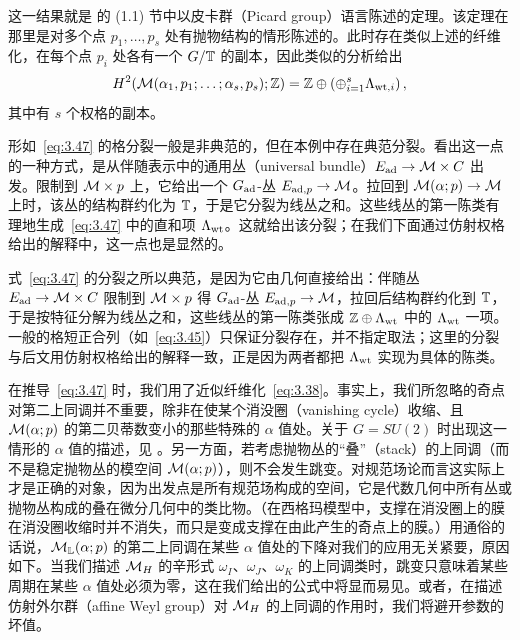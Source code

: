 这一结果就是 \cite{ref54} 的 (1.1) 节中以皮卡群（Picard group）语言陈述的定理。该定理在那里是对多个点 $p_1,\dots,p_s$ 处有抛物结构的情形陈述的。此时存在类似上述的纤维化，在每个点 $p_i$ 处各有一个 $G/{\mathbb{T}}$ 的副本，因此类似的分析给出
\setcounter{equation}{47}
\begin{equation}\label{eq:3.48}
  H^2({\mathcal{M}}(\alpha_1,p_1;\dots;\alpha_s,p_s);{\mathbb{Z}})={\mathbb{Z}}\oplus\left(\oplus_{i=1}^s
\Lambda_{{\rm wt},i}\right),
\end{equation}
其中有 $s$ 个权格的副本。

形如~\eqref{eq:3.47} 的格分裂一般是非典范的，但在本例中存在典范分裂。看出这一点的一种方式，是从伴随表示中的通用丛（universal bundle）$E_{\rm ad}\to {\mathcal{M}}\times C$ 出发。限制到 ${\mathcal{M}}\times p$ 上，它给出一个 $G_{\rm ad}$-丛 $E_{{\rm ad},p}\to {\mathcal{M}}$。拉回到 ${\mathcal{M}}(\alpha;p)\to {\mathcal{M}}$ 上时，该丛的结构群约化为 ${\mathbb{T}}$，于是它分裂为线丛之和。这些线丛的第一陈类有理地生成~\eqref{eq:3.47} 中的直和项 $\Lambda_{\rm wt}$。这就给出该分裂；在我们下面通过仿射权格给出的解释中，这一点也是显然的。

\begin{yizhu}[易错点]式~\eqref{eq:3.47} 的分裂之所以典范，是因为它由几何直接给出：伴随丛 $E_{\rm ad}\to {\mathcal{M}}\times C$ 限制到 ${\mathcal{M}}\times p$ 得 $G_{\rm ad}$-丛 $E_{{\rm ad},p}\to{\mathcal{M}}$，拉回后结构群约化到 ${\mathbb{T}}$，于是按特征分解为线丛之和，这些线丛的第一陈类张成 ${\mathbb{Z}}\oplus\Lambda_{\rm wt}$ 中的 $\Lambda_{\rm wt}$ 一项。一般的格短正合列（如~\eqref{eq:3.45}）只保证分裂存在，并不指定取法；这里的分裂与后文用仿射权格给出的解释一致，正是因为两者都把 $\Lambda_{\rm wt}$ 实现为具体的陈类。\end{yizhu}

在推导~\eqref{eq:3.47} 时，我们用了近似纤维化~\eqref{eq:3.38}。事实上，我们所忽略的奇点对第二上同调并不重要，除非在使某个消没圈（vanishing cycle）收缩、且 ${\mathcal{M}}(\alpha;p)$ 的第二贝蒂数变小的那些特殊的 $\alpha$ 值处。关于 $G=SU(2)$ 时出现这一情形的 $\alpha$ 值的描述，见 \cite{ref55}。另一方面，若考虑抛物丛的“叠”（stack）的上同调（而不是稳定抛物丛的模空间 ${\mathcal{M}}(\alpha;p)$），则不会发生跳变。对规范场论而言这实际上才是正确的对象，因为出发点是所有规范场构成的空间，它是代数几何中所有丛或抛物丛构成的叠在微分几何中的类比物。（在西格玛模型中，支撑在消没圈上的膜在消没圈收缩时并不消失，而只是变成支撑在由此产生的奇点上的膜。）用通俗的话说，${\mathcal{M}}_\mathbb{L}(\alpha;p)$ 的第二上同调在某些 $\alpha$ 值处的下降对我们的应用无关紧要，原因如下。当我们描述 ${{\mathcal{M}}_H}$ 的辛形式 $\omega_I$、$\omega_J$、$\omega_K$ 的上同调类时，跳变只意味着某些周期在某些 $\alpha$ 值处必须为零，这在我们给出的公式中将显而易见。或者，在描述仿射外尔群（affine Weyl group）对 ${{\mathcal{M}}_H}$ 的上同调的作用时，我们将避开参数的坏值。

